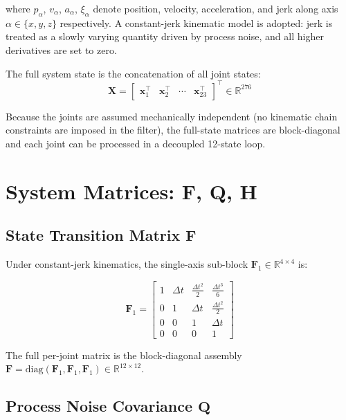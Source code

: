 \documentclass[12pt, a4paper]{article}
\begin{document}
where $p_\alpha$, $v_\alpha$, $a_\alpha$, $\xi_\alpha$ denote position, velocity, acceleration, and jerk along axis $\alpha \in \{x,y,z\}$ respectively. A constant-jerk kinematic model is adopted: jerk is treated as a slowly varying quantity driven by process noise, and all higher derivatives are set to zero.

The full system state is the concatenation of all joint states:
\[
\mathbf{X} = \begin{bmatrix} \mathbf{x}_1^\top & \mathbf{x}_2^\top & \cdots & \mathbf{x}_{23}^\top \end{bmatrix}^\top \in \mathbb{R}^{276}
\]

Because the joints are assumed mechanically independent (no kinematic chain constraints are imposed in the filter), the full-state matrices are block-diagonal and each joint can be processed in a decoupled 12-state loop.

\section{System Matrices: F, Q, H}

\subsection{State Transition Matrix \texorpdfstring{$\mathbf{F}$}{F}}

Under constant-jerk kinematics, the single-axis sub-block $\mathbf{F}_1 \in \mathbb{R}^{4\times4}$ is:

\begin{equation}
\mathbf{F}_1 = \begin{bmatrix}
1 & \Delta t & \tfrac{\Delta t^2}{2} & \tfrac{\Delta t^3}{6} \\
0 & 1 & \Delta t & \tfrac{\Delta t^2}{2} \\
0 & 0 & 1 & \Delta t \\
0 & 0 & 0 & 1
\end{bmatrix}
\label{eq:F1}
\end{equation}

The full per-joint matrix is the block-diagonal assembly $\mathbf{F} = \mathrm{diag}(\mathbf{F}_1,\mathbf{F}_1,\mathbf{F}_1) \in \mathbb{R}^{12\times12}$.

\subsection{Process Noise Covariance \texorpdfstring{$\mathbf{Q}$}{Q}}
\end{document}
